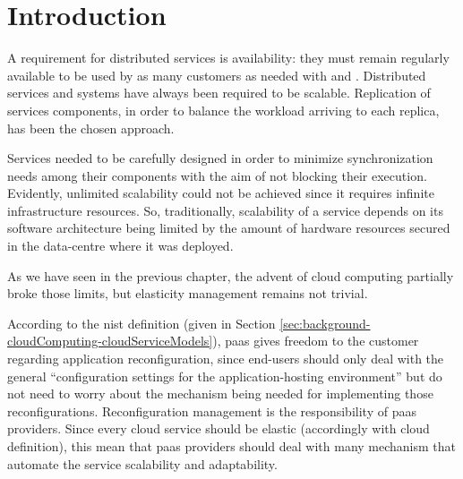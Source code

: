 %
%
\section{Introduction}
\label{sec:elasticity-introduction}
A requirement for distributed services is availability: they must remain regularly available to be
used by as many customers as needed with  and .
Distributed services and systems have always been required to be scalable. Replication of services
components, in order to balance the workload arriving to each replica, has been the chosen approach.

Services needed to be carefully designed in order to minimize synchronization needs among their
components with the aim of not blocking their execution. Evidently, unlimited scalability could not be
achieved since it requires infinite infrastructure resources. So, traditionally, scalability of a
service depends on its software architecture being limited by the amount of hardware resources secured
in the data-centre where it was deployed.

As we have seen in the previous chapter, the advent of cloud computing partially broke those limits, but
elasticity management remains not trivial.

According to the \ac{nist} definition (given in Section
\ref{sec:background-cloudComputing-cloudServiceModels}), \ac{paas} gives freedom to the customer regarding
application reconfiguration, since end-users should only deal with the general ``configuration settings
for the application-hosting environment'' but do not need to worry about the mechanism being needed
for implementing those reconfigurations. Reconfiguration management is the responsibility of \ac{paas}
providers. Since every cloud service should be elastic (accordingly with cloud definition), this mean
that \ac{paas} providers should deal with many mechanism that automate the service scalability and
adaptability.

